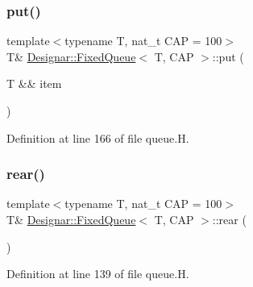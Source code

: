 \mbox{\label{class_designar_1_1_fixed_queue_a66a9b9f7118ec4943f7af273879c6b52}} 
\subsubsection{\texorpdfstring{put()}{put()}\hspace{0.1cm}{\footnotesize\ttfamily [2/2]}}
{\footnotesize\ttfamily template$<$typename T, nat\+\_\+t C\+AP = 100$>$ \\
T\& \hyperlink{class_designar_1_1_fixed_queue}{Designar\+::\+Fixed\+Queue}$<$ T, C\+AP $>$\+::put (\begin{DoxyParamCaption}\item[{T \&\&}]{item }\end{DoxyParamCaption})\hspace{0.3cm}{\ttfamily [inline]}}



Definition at line 166 of file queue.\+H.

\mbox{\label{class_designar_1_1_fixed_queue_a820470e5e649e48a352b334f158c8eb3}} 
\subsubsection{\texorpdfstring{rear()}{rear()}\hspace{0.1cm}{\footnotesize\ttfamily [1/2]}}
{\footnotesize\ttfamily template$<$typename T, nat\+\_\+t C\+AP = 100$>$ \\
T\& \hyperlink{class_designar_1_1_fixed_queue}{Designar\+::\+Fixed\+Queue}$<$ T, C\+AP $>$\+::rear (\begin{DoxyParamCaption}{ }\end{DoxyParamCaption})\hspace{0.3cm}{\ttfamily [inline]}}



Definition at line 139 of file queue.\+H.

\mbox{\label{class_designar_1_1_fixed_queue_ab634bd79b51287ddbcd1ba24bc72fcae}} 
